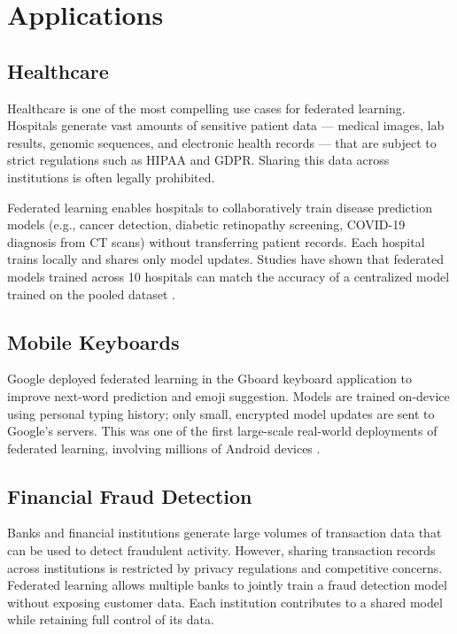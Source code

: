 \documentclass[conference]{IEEEtran}
\begin{document}
\section{Applications}

\subsection{Healthcare}
Healthcare is one of the most compelling use cases for federated learning. Hospitals generate vast amounts of sensitive patient data — medical images, lab results, genomic sequences, and electronic health records — that are subject to strict regulations such as HIPAA and GDPR. Sharing this data across institutions is often legally prohibited.

Federated learning enables hospitals to collaboratively train disease prediction models (e.g., cancer detection, diabetic retinopathy screening, COVID-19 diagnosis from CT scans) without transferring patient records. Each hospital trains locally and shares only model updates. Studies have shown that federated models trained across 10 hospitals can match the accuracy of a centralized model trained on the pooled dataset \cite{rieke2020}.

\subsection{Mobile Keyboards}
Google deployed federated learning in the Gboard keyboard application to improve next-word prediction and emoji suggestion. Models are trained on-device using personal typing history; only small, encrypted model updates are sent to Google's servers. This was one of the first large-scale real-world deployments of federated learning, involving millions of Android devices \cite{bonawitz2019}.

\subsection{Financial Fraud Detection}
Banks and financial institutions generate large volumes of transaction data that can be used to detect fraudulent activity. However, sharing transaction records across institutions is restricted by privacy regulations and competitive concerns. Federated learning allows multiple banks to jointly train a fraud detection model without exposing customer data. Each institution contributes to a shared model while retaining full control of its data.
\end{document}

